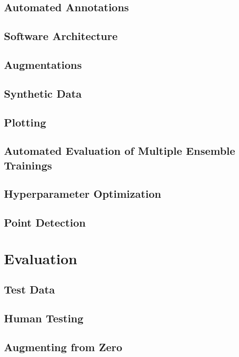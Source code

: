 \documentclass[10pt]{book}
\begin{document}
\section{Automated Annotations}

\section{Software Architecture}

\section{Augmentations}

\section{Synthetic Data}

\section{Plotting}

\section{Automated Evaluation of Multiple Ensemble Trainings}

\section{Hyperparameter Optimization}

\section{Point Detection}

\chapter{Evaluation}
\label{chap:eval}

\section{Test Data}

\section{Human Testing}

\section{Augmenting from Zero}
\end{document}
